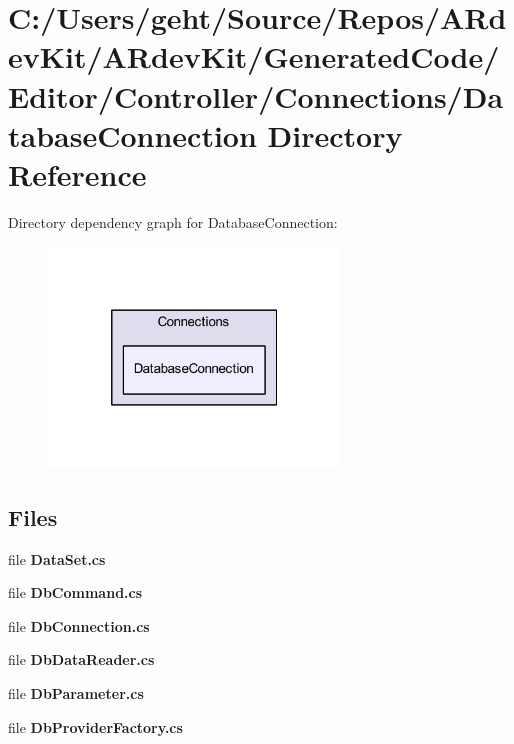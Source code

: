\section{C\-:/\-Users/geht/\-Source/\-Repos/\-A\-Rdev\-Kit/\-A\-Rdev\-Kit/\-Generated\-Code/\-Editor/\-Controller/\-Connections/\-Database\-Connection Directory Reference}
\label{dir_bb6c80363d1acd2f8d905c4acaa1ab2b}
Directory dependency graph for Database\-Connection\-:
\nopagebreak
\begin{figure}[H]
\begin{center}
\leavevmode
\includegraphics[width=220pt]{dir_bb6c80363d1acd2f8d905c4acaa1ab2b_dep}
\end{center}
\end{figure}
\subsection*{Files}
\begin{DoxyCompactItemize}
\item 
file {\bfseries Data\-Set.\-cs}
\item 
file {\bfseries Db\-Command.\-cs}
\item 
file {\bfseries Db\-Connection.\-cs}
\item 
file {\bfseries Db\-Data\-Reader.\-cs}
\item 
file {\bfseries Db\-Parameter.\-cs}
\item 
file {\bfseries Db\-Provider\-Factory.\-cs}
\end{DoxyCompactItemize}
